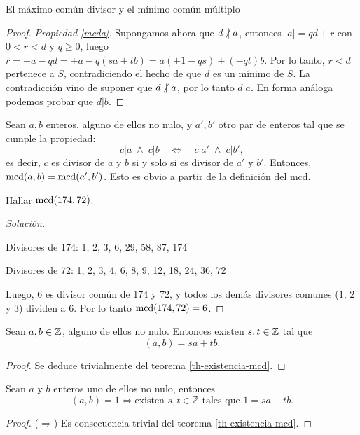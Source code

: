 \begin{section}{El máximo común divisor y el mínimo común múltiplo}
\begin{proof}
    \textit{Propiedad {\ref{mcda}}.} Supongamos ahora que $d \operatorname{\not|\,}  a$,  entonces $|a| = qd + r$ con $0 < r <d$ y $q \ge 0$, luego $r = \pm a - qd = \pm a-q(sa+tb) = a(\pm1-qs) +(-qt)b$. Por lo tanto,  $r < d$  pertenece a $S$, contradiciendo  el hecho de que $d$  es un mínimo de $S$. La contradicción vino de suponer que  $d \operatorname{\not|\,}  a$, por lo tanto $d|a$. En  forma análoga podemos probar que $d|b$. 
\end{proof}



\begin{observacion}\label{obs-mcd-divisores} Sean $a,b$ enteros,  alguno de ellos  no nulo, y $a', b'$ otro par de enteros tal que se cumple la propiedad:
    $$
    c |a \; \wedge\;  c| b \quad \Leftrightarrow \quad  c |a' \; \wedge\;  c| b', 
    $$
    es decir, $c$  es divisor de $a$ y $b$ si y solo si es divisor de $a'$ y $b'$. Entonces,  $\operatorname{mcd}(a,b) = \operatorname{mcd}(a',b')$. Esto es obvio a partir de la definición del mcd.
    
\end{observacion}

\begin{ejemplo*} Hallar   $\operatorname{mcd}(174,72)$.
    \begin{proof}[Solución] ${^{}}$
        
        Divisores de 174: 1, 2, 3, 6, 29, 58, 87, 174
        
        Divisores de 72: 1, 2, 3, 4, 6, 8, 9, 12, 18, 24, 36, 72 
        
        Luego, $6$ es divisor común de 174 y 72, y todos los demás divisores comunes ($1$, $2$ y $3$) dividen a $6$. Por lo tanto $\operatorname{mcd}(174,72) =6$.
    \end{proof}
\end{ejemplo*}

\begin{corolario}\label{prop-d-comb-lin}
    Sean $a,b \in \mathbb Z$, alguno de ellos no nulo. Entonces existen $s,t \in \mathbb Z$ tal que
    \begin{equation*}
    (a,b) = sa + tb. 
    \end{equation*}
\end{corolario}
\begin{proof}
    Se deduce trivialmente del teorema \ref{th-existencia-mcd}. 
\end{proof}

\begin{corolario} Sean $a$ y $b$ enteros uno de ellos no nulo, entonces
    $$
    (a,b) = 1 \Leftrightarrow \text{existen $s,t \in \mathbb Z$ tales que $1 = sa+tb$.}
    $$
\end{corolario}
\begin{proof}
    ($\Rightarrow$) Es consecuencia trivial  del teorema \ref{th-existencia-mcd}. 
    

\end{proof}
\end{section}
